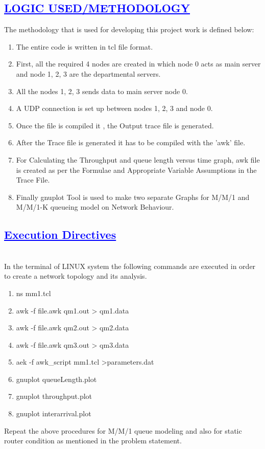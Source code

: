\documentclass[a4paper,12pt]{report}
\begin{document}
\begin{center}
\chapter{\textcolor{blue}{\underline {LOGIC USED/METHODOLOGY}}}
\end{center}
The methodology that is used for developing this project work is defined below:
\begin{enumerate} 
\item The entire code is written in tcl file format.
\item First, all the required 4 nodes are created in which node 0 acts as main server and node 1, 2, 3 are the departmental servers.
\item All the nodes 1, 2, 3 sends data to main server node 0.
\item A UDP connection is set up between nodes 1, 2, 3 and node 0.
\item Once the file is compiled it , the Output trace file is generated.
\item After the Trace file is generated it has to be compiled with the 'awk' file.
\item For Calculating the Throughput and queue length versus time graph, awk file is created as per the Formulae and Appropriate Variable Assumptions in the Trace File.
\item Finally gnuplot Tool is used to make two separate Graphs for M/M/1 and M/M/1-K queueing model on Network Behaviour.
\end{enumerate}


\begin{center}
\chapter{\textcolor{blue}{\underline {Execution Directives}}}
\end{center}
\noindent \\ In the terminal of LINUX system the following commands are executed in order to create a network topology and its analysis.\\
\begin{enumerate}
\item ns mm1.tcl
\item awk -f file.awk qm1.out > qm1.data
\item awk -f file.awk qm2.out > qm2.data
\item awk -f file.awk qm3.out > qm3.data
\item aek -f awk_script mm1.tcl >parameters.dat
\item gnuplot queueLength.plot
\item gnuplot throughput.plot
\item gnuplot interarrival.plot

\end{enumerate}
\noindent Repeat the above procedures for M/M/1 queue modeling and also for static router condition as mentioned in the problem statement.
\end{document}
